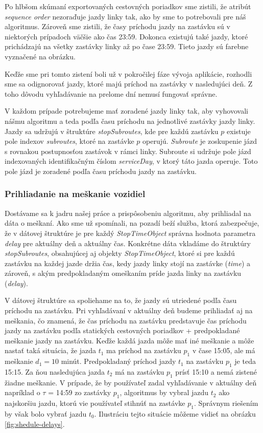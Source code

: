 Po hlbšom skúmaní exportovaných cestovných poriadkov sme zistili, že atribút \textit{sequence order} nezoraďuje jazdy linky tak, ako by sme to potrebovali pre náš algoritmus. Zároveň sme zistili, že časy príchodu jazdy na zastávku sú v niektorých prípadoch väčšie ako čas 23:59. Dokonca existujú také jazdy, ktoré prichádzajú na všetky zastávky linky až po čase 23:59. Tieto jazdy sú farebne vyznačené na obrázku.

Keďže sme pri tomto zistení boli už v pokročilej fáze vývoja aplikácie, rozhodli sme sa odignorovať jazdy, ktoré majú príchod na zastávky v nasledujúci deň. Z toho dôvodu vyhľadávanie na prelome dní nemusí fungovať správne.

V každom prípade potrebujeme mať zoradené jazdy linky tak, aby vyhovovali nášmu algoritmu a teda podľa času príchodu na jednotlivé zastávky jazdy linky. Jazdy sa udržujú v štruktúre \textit{stopSubroutes}, kde pre každú zastávku $p$ existuje pole indexov \textit{subroutes}, ktoré na zastávke $p$ operujú. \textit{Subroute} je zoskupenie jázd s rovnakou postupnosťou zastávok v rámci linky. Subroute si udržuje pole jázd indexovaných identifikačným číslom \textit{serviceDay}, v ktorý táto jazda operuje. Toto pole jázd je zoradené podľa času príchodu jazdy na zastávku. 

\subsubsection{Prihliadanie na meškanie vozidiel}
Dostávame sa k jadru našej práce a prispôsobeniu algoritmu, aby prihliadal na dáta o meškaní. Ako sme už spomínali, na pozadí beží služba, ktorá zabezpečuje, že v dátovej štruktúre je pre každý \textit{StopTimeObject} správna hodnota parametra \textit{delay} pre aktuálny deň a aktuálny čas. 
Konkrétne dáta vkladáme do štruktúry \textit{stopSubroutes}, obsahujúcej aj objekty \textit{StopTimeObject}, ktoré si pre každú zastávku na každej jazde držia čas, kedy jazdy linky stojí na zastávke (\textit{time}) a zároveň, s akým predpokladaným omeškaním príde jazda linky na zastávku (\textit{delay}). 

V dátovej štruktúre sa spoliehame na to, že jazdy sú utriedené podľa času príchodu na zastávku. Pri vyhľadávaní v aktuálny deň budeme prihliadať aj na meškania, čo znamená, že čas príchodu na zastávku predstavuje čas príchodu jazdy na zastávku podľa statických cestovných poriadkov + predpokladané meškanie jazdy na zastávku. Keďže každá jazda môže mať iné meškanie a môže nastať taká situácia, že jazda $t_1$ ma príchod na zastávku $p_1$ v čase 15:05, ale má meškanie $d_1=10$ minút. Predpokladaný príchod jazdy $t_1$ na zastávku $p_1$ je teda 15:15. Za ňou nasledujúca jazda $t_2$ má na zastávku $p_1$ prísť 15:10 a nemá zistené žiadne meškanie. V prípade, že by používateľ zadal vyhľadávanie v aktuálny deň napríklad o $\tau$ = 14:59 zo zastávky $p_1$, algoritmus by vybral jazdu $t_2$ ako najskoršiu jazdu, ktorú vie používateľ stihnúť na zastávke $p_1$. Správnym riešením by však bolo vybrať jazdu $t_0$. Ilustráciu tejto situácie môžeme vidieť na obrázku \ref{fig:shedule-delays}. 

